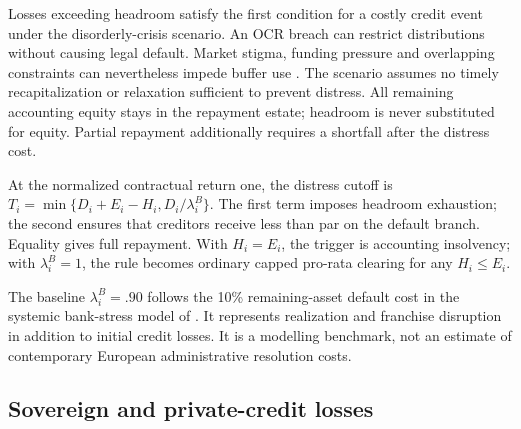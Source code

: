 \begin{table}[htbp]
\centering
{}
\label{tab:ocr-headroom}
\small



\end{table}

Losses exceeding headroom satisfy the first condition for a costly credit event under the disorderly-crisis scenario. An OCR breach can restrict distributions without causing legal default. Market stigma, funding pressure and overlapping constraints can nevertheless impede buffer use \citep{ECBBuffer2023,ECBESRB2026}. The scenario assumes no timely recapitalization or relaxation sufficient to prevent distress. All remaining accounting equity stays in the repayment estate; headroom is never substituted for equity. Partial repayment additionally requires a shortfall after the distress cost.

At the normalized contractual return one, the distress cutoff is $T_i=\min\{D_i+E_i-H_i,D_i/\lambda_i^B\}$. The first term imposes headroom exhaustion; the second ensures that creditors receive less than par on the default branch. Equality gives full repayment. With $H_i=E_i$, the trigger is accounting insolvency; with $\lambda_i^B=1$, the rule becomes ordinary capped pro-rata clearing for any $H_i\leq E_i$.

The baseline $\lambda_i^B=.90$ follows the 10\% remaining-asset default cost in the systemic bank-stress model of \citet{Aikman2009}. It represents realization and franchise disruption in addition to initial credit losses. It is a modelling benchmark, not an estimate of contemporary European administrative resolution costs.

\subsection{Sovereign and private-credit losses}

